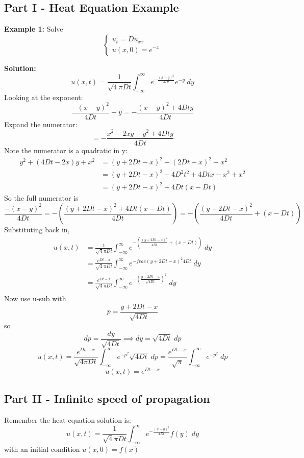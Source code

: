 \documentclass[12pt]{article}
\begin{document}
\subsection*{Part I - Heat Equation Example}
\textbf{Example 1:} Solve 
\[\begin{cases}
    u_t = Du_{xx}\\
    u(x, 0) = e^{-x}
\end{cases}\]

\textbf{Solution:}
\[u(x, t) = \frac{1}{\sqrt4\pi D t} \int_{-\infty}^\infty e^{-\frac{(x - y)^2}{4Dt}} e^{-y} \; dy\]
Looking at the exponent:
\[\frac{-(x-y)^2}{4Dt} - y = -\frac{(x-y)^2 + 4Dty}{4Dt}\]
Expand the numerator:
\[ = -\frac{x^2 - 2xy - y^2 + 4Dty}{4Dt}\]
Note the numerator is a quadratic in y:
\begin{align*}
    y^2 + (4Dt - 2x)y + x^2 &= (y + 2Dt - x)^2 - (2Dt - x)^2 + x^2\\
    &= (y + 2Dt - x)^2 - 4D^2t^2 + 4Dtx - x^2 + x^2\\
    &= (y + 2Dt - x)^2 + 4Dt(x - Dt)
\end{align*}
So the full numerator is 
\[\frac{-(x-y)^2}{4Dt} = -\left(\frac{(y + 2Dt - x)^2 + 4Dt(x - Dt)}{4Dt}\right) = -\left(\frac{(y+2Dt-x)^2}{4Dt}+ (x - Dt)\right)\]
Substituting back in, 
\begin{align*}
    u(x, t) &= \frac{1}{\sqrt4\pi D t} \int_{-\infty}^\infty e^{-\left(\frac{(y+2Dt-x)^2}{4Dt}+ (x - Dt)\right)} \; dy\\
    &= \frac{e^{Dt - x}}{\sqrt4\pi D t}\int_{-\infty}^\infty e^{-frac{(y+2Dt-x)^2}{4Dt}} \; dy\\
    &= \frac{e^{Dt - x}}{\sqrt4\pi D t}\int_{-\infty}^\infty e^{-\left(\frac{y+2Dt-x}{\sqrt{4Dt}}\right)^2} \; dy\\
\end{align*}
Now use u-sub with 
\[p = \frac{y+2Dt-x}{\sqrt{4Dt}}\]
so 
\[dp = \frac{dy}{\sqrt{4Dt}} \implies dy = \sqrt{4Dt} \; dp\]
\[u(x, t) = \frac{e^{Dt - x}}{\sqrt{4\pi D t}}\int_{-\infty}^\infty e^{-p^2} \sqrt{4Dt}\; dp = \frac{e^{Dt - x}}{\sqrt{\pi}} \int_{-\infty}^\infty e^{-p^2}\; dp\]
\[\boxed{u(x, t) = e^{Dt- x}}\]

\subsection*{Part II - Infinite speed of propagation}
Remember the heat equation solution is:
\[u(x, t) = \frac{1}{\sqrt4\pi D t} \int_{-\infty}^\infty e^{-\frac{(x - y)^2}{4Dt}} f(y) \; dy\]
with an initial condition $u(x, 0) = f(x)$
\end{document}
